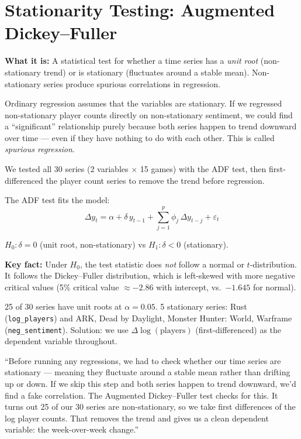 \documentclass[11pt, letterpaper]{article}
\theoremstyle{definition}
\begin{document}
\section{Stationarity Testing: Augmented Dickey--Fuller}

\textbf{What it is:} A statistical test for whether a time series has a \emph{unit root} (non-stationary trend) or is stationary (fluctuates around a stable mean). Non-stationary series produce spurious correlations in regression.

\begin{whybox}
Ordinary regression assumes that the variables are stationary.
If we regressed non-stationary player counts directly on non-stationary sentiment, we could find a ``significant'' relationship purely because both series happen to trend downward over time --- even if they have nothing to do with each other.
This is called \emph{spurious regression}.

We tested all 30 series (2 variables $\times$ 15 games) with the ADF test, then first-differenced the player count series to remove the trend before regression.
\end{whybox}

\begin{mathbox}
The ADF test fits the model:
\[
    \Delta y_t = \alpha + \delta\, y_{t-1} + \sum_{j=1}^{p} \phi_j\, \Delta y_{t-j} + \varepsilon_t
\]

$H_0: \delta = 0$ (unit root, non-stationary) \quad vs \quad $H_1: \delta < 0$ (stationary).

\textbf{Key fact:} Under $H_0$, the test statistic does \emph{not} follow a normal or $t$-distribution.
It follows the Dickey--Fuller distribution, which is left-skewed with more negative critical values (5\% critical value $\approx -2.86$ with intercept, vs.\ $-1.645$ for normal).
\end{mathbox}

\begin{resultbox}
25 of 30 series have unit roots at $\alpha = 0.05$.
5 stationary series: Rust (\texttt{log\_players}) and ARK, Dead by Daylight, Monster Hunter: World, Warframe (\texttt{neg\_sentiment}).
Solution: we use $\Delta\log(\text{players})$ (first-differenced) as the dependent variable throughout.
\end{resultbox}

\begin{speakerbox}
``Before running any regressions, we had to check whether our time series are stationary --- meaning they fluctuate around a stable mean rather than drifting up or down.
If we skip this step and both series happen to trend downward, we'd find a fake correlation.
The Augmented Dickey--Fuller test checks for this.
It turns out 25 of our 30 series are non-stationary, so we take first differences of the log player counts.
That removes the trend and gives us a clean dependent variable: the week-over-week change.''
\end{speakerbox}
\end{document}
